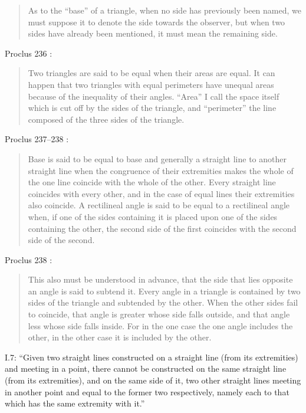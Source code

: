 \documentclass{article}
\begin{document}
\begin{quote}
As to the ``base'' of a triangle, when no side has previously been named,
we must suppose it to denote the side towards the observer, but when two sides have already been mentioned,
it must mean the remaining side.
\end{quote}

Proclus 236 \cite[p.~185]{proclus}:

\begin{quote}
Two triangles are said to be equal when their areas are equal. It can happen that
two triangles with equal perimeters have unequal areas because of the inequality of their
angles. ``Area'' I call the space itself which is cut off by the sides of the triangle,
and ``perimeter'' the line composed of the three sides of the triangle.
\end{quote}

Proclus 237--238 \cite[p.~185]{proclus}:

\begin{quote}
Base is said to be equal to base and generally a straight line
to another straight line when the congruence of their extremities
makes the whole of the one line coincide with the whole
of the other. Every straight line coincides with every other,
and in the case of equal lines their extremities also coincide.
A rectilineal angle is said to be equal to a rectilineal angle when,
if one of the sides containing it is placed upon one of 
the sides containing the other, the second side of the first coincides
with the second side of the second.
\end{quote}

Proclus 238 \cite[p.~186]{proclus}:

\begin{quote}
This also must  be understood in advance, that the side that
lies opposite an angle is said to subtend it. Every angle in a 
triangle is contained by two sides of the triangle and subtended by the other.
When the other 
sides fail to coincide, that angle is greater whose side falls
outside, and that angle less whose side falls inside. For in the
one case the one angle includes the other, in the other case it
is included by the other.
\end{quote}

I.7: ``Given two straight lines constructed on a straight line
(from its extremities) and meeting in a point, there cannot be
constructed on the same straight line (from its extremities),
and on the same side of it, two other straight lines meeting in
another point and equal to the former two respectively, namely
each to that which has the same extremity with it.''
\end{document}
